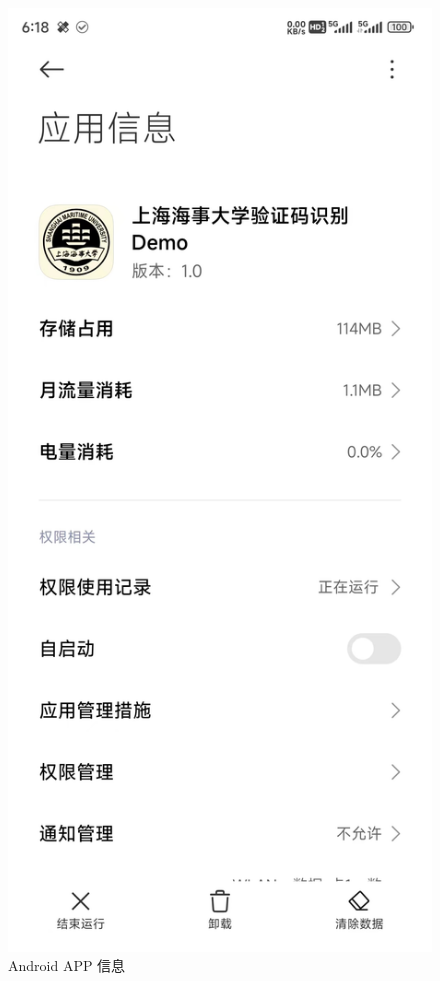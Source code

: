 \begin{figure}
	\centering
	\includegraphics[width=0.6\linewidth]{Resources/Picture/app_info}
	\caption{Android APP 信息}
	\label{fig:appinfo}
\end{figure}


